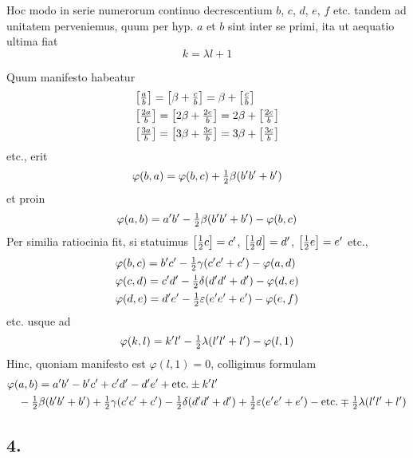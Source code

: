 \documentclass[twoside,12pt]{memoir}
\let\oldfrac\frac
\def\frac#1#2{\mathchoice{\tfrac{#1}{#2}}{\oldfrac{#1}{#2}}{\genfrac{}{}{}{2}{#1}{#2\mathstrut}}{\genfrac{}{}{}{3}{#1}{#2\mathstrut}}}
\begin{document}
Hoc modo in serie numerorum continuo decrescentium \(b\), \(c\), \(d\), \(e\), \(f\) etc. tandem ad unitatem perveniemus, quum per hyp. \(a\) et \(b\) sint inter se primi, ita ut aequatio ultima fiat
\[k=\lambda l+1\]

Quum manifesto habeatur
\[\begin{aligned}
& {\left[\frac{a}{b}\right]=\left[\beta+\frac{c}{b}\right]=\beta+\left[\frac{c}{b}\right]} \\
& {\left[\frac{2 a}{b}\right]=\left[2 \beta+\frac{2 c}{b}\right]=2 \beta+\left[\frac{2 c}{b}\right]} \\
& {\left[\frac{3 a}{b}\right]=\left[3 \beta+\frac{3 c}{b}\right]=3 \beta+\left[\frac{3 c}{b}\right]}
\end{aligned}\]
etc., erit
\[\varphi(b, a)=\varphi(b, c)+\frac{1}{2} \beta (b^{\prime} b^{\prime}+b^{\prime})\]
et proin
\[\varphi(a, b)=a^{\prime} b^{\prime}-\frac{1}{2} \beta (b^{\prime} b^{\prime}+b^{\prime})-\varphi(b, c)\]
Per similia ratiocinia fit, si statuimus \(\left[\frac{1}{2} c\right]=c^{\prime}\), \(\left[\frac{1}{2} d\right]=d^{\prime}\), \(\left[\frac{1}{2} e\right]=e^{\prime}\) etc.,
\[\begin{aligned}
& \varphi(b, c)=b^{\prime} c^{\prime}-\frac{1}{2} \gamma(c^{\prime} c^{\prime}+c^{\prime})-\varphi(a, d) \\
& \varphi(c, d)=c^{\prime} d^{\prime}-\frac{1}{2} \delta(d^{\prime} d^{\prime}+d^{\prime})-\varphi(d, e) \\
& \varphi(d, e)=d^{\prime} e^{\prime}-\frac{1}{2} \varepsilon(e^{\prime} e^{\prime}+e^{\prime})-\varphi(e, f)
\end{aligned}\]
etc. usque ad
\[\varphi(k, l)=k^{\prime} l^{\prime}-\frac{1}{2} \lambda(l^{\prime} l^{\prime}+l^{\prime})-\varphi(l, 1)\]
Hinc, quoniam manifesto est \(\varphi(l, 1)=0\), colligimus formulam
\[\begin{aligned}
& \varphi(a, b)=a^{\prime} b^{\prime}-b^{\prime} c^{\prime}+c^{\prime} d^{\prime}-d^{\prime} e^{\prime}+\text{etc.} \pm k^{\prime} l^{\prime} \\
& \quad-\frac{1}{2} \beta (b^{\prime} b^{\prime}+b^{\prime})+\frac{1}{2} \gamma(c^{\prime} c^{\prime}+c^{\prime})-\frac{1}{2} \delta(d^{\prime} d^{\prime}+d^{\prime})+\frac{1}{2} \varepsilon(e^{\prime} e^{\prime}+e^{\prime})-\text{etc.} \mp \frac{1}{2} \lambda(l^{\prime} l^{\prime}+l^{\prime})
\end{aligned}\]

\subsection*{4.}
 
\end{document}
